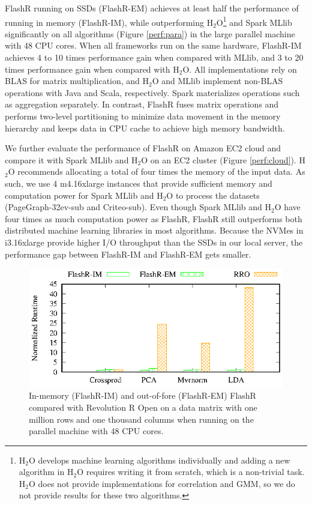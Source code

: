 FlashR running on SSDs (FlashR-EM) achieves at least half the performance of
running in memory (FlashR-IM), while outperforming H$_2$O\footnote{
H$_2$O develops machine learning algorithms individually and adding
a new algorithm in H$_2$O requires writing it from scratch, which is
a non-trivial task. H$_2$O does not provide implementations for correlation
and GMM, so we do not provide results for these two algorithms.}
and Spark MLlib significantly on all algorithms
(Figure \ref{perf:para}) in the large parallel machine with 48 CPU cores.
When all frameworks run on the same hardware, FlashR-IM achieves 4 to 10 times
performance gain when compared
with MLlib, and 3 to 20 times performance gain when compared with H$_2$O.
All implementations rely on BLAS for matrix multiplication, and H$_2$O
and MLlib implement non-BLAS operations with Java and Scala, respectively.
Spark materializes operations such as aggregation separately. In contrast,
FlashR fuses matrix operations and performs two-level partitioning to
minimize data movement in the memory hierarchy and keeps data in CPU cache
to achieve high memory bandwidth.


We further evaluate the performance of FlashR on Amazon EC2 cloud and compare it
with Spark MLlib and H$_2$O on an EC2 cluster (Figure \ref{perf:cloud}). H$_2$O
recommends
allocating a total of four times the memory of the input data. As such, we use
4 m4.16xlarge instances that provide sufficient memory and computation power for
Spark MLlib and H$_2$O to process the datasets (PageGraph-32ev-sub and Criteo-sub).
Even though Spark MLlib and H$_2$O have four times as much computation power as FlashR,
FlashR still outperforms both distributed machine learning libraries in most algorithms.
Because the NVMes in i3.16xlarge provide higher I/O throughput than the SSDs
in our local server, the performance gap between FlashR-IM and FlashR-EM gets
smaller.

\begin{figure}[b]
  \vspace{-10pt}
	\begin{center}
		\footnotesize
		\includegraphics{FlashMatrix_figs/FlashR-vs-RRO.eps}
		\vspace{-10pt}
		\caption{In-memory (FlashR-IM) and out-of-fore (FlashR-EM) FlashR
		compared with Revolution R Open on a data matrix with one million rows
		and one thousand columns when running on the parallel machine with
		48 CPU cores.}
		\label{fig:fmR}
	\end{center}
  \vspace{-15pt}
\end{figure}

